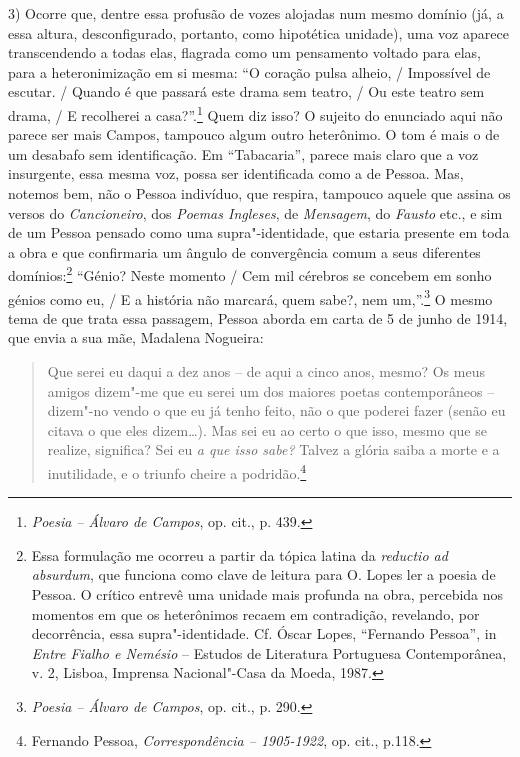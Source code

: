 3) Ocorre que, dentre essa profusão de vozes alojadas num mesmo domínio
(já, a essa altura, desconfigurado, portanto, como hipotética unidade),
uma voz aparece transcendendo a todas elas, flagrada como um pensamento
voltado para elas, para a heteronimização em si mesma: ``O coração pulsa
alheio, / Impossível de escutar. / Quando é que passará este drama sem
teatro, / Ou este teatro sem drama, / E recolherei a casa?''.\footnote{\emph{Poesia
  -- Álvaro de Campos}, op. cit., p. 439.} Quem diz isso? O sujeito do
enunciado aqui não parece ser mais Campos, tampouco algum outro
heterônimo. O tom é mais o de um desabafo sem identificação. Em
``Tabacaria'', parece mais claro que a voz insurgente, essa mesma voz,
possa ser identificada como a de Pessoa. Mas, notemos bem, não o Pessoa
indivíduo, que respira, tampouco aquele que assina os versos do
\emph{Cancioneiro}, dos \emph{Poemas Ingleses}, de \emph{Mensagem}, do
\emph{Fausto} etc., e sim de um Pessoa pensado como uma
supra"-identidade, que estaria presente em toda a obra e que confirmaria
um ângulo de convergência comum a seus diferentes domínios:\footnote{Essa
  formulação me ocorreu a partir da tópica latina da \emph{reductio ad
  absurdum}, que funciona como clave de leitura para O. Lopes ler a
  poesia de Pessoa. O crítico entrevê uma unidade mais profunda na obra,
  percebida nos momentos em que os heterônimos recaem em contradição,
  revelando, por decorrência, essa supra"-identidade. Cf. Óscar Lopes,
  ``Fernando Pessoa'', in \emph{Entre Fialho e Nemésio} -- Estudos de
  Literatura Portuguesa Contemporânea, v. 2, Lisboa, Imprensa
  Nacional"-Casa da Moeda, 1987.} ``Génio? Neste momento / Cem mil
cérebros se concebem em sonho génios como eu, / E a história não
marcará, quem sabe?, nem um,''.\footnote{\emph{Poesia -- Álvaro de
  Campos}, op. cit., p. 290.} O mesmo tema de que trata essa passagem,
Pessoa aborda em carta de 5 de junho de 1914, que envia a sua mãe,
Madalena Nogueira:

\begin{quote}
Que serei eu daqui a dez anos -- de aqui a cinco anos, mesmo? Os meus
amigos dizem"-me que eu serei um dos maiores poetas contemporâneos --
dizem"-no vendo o que eu já tenho feito, não o que poderei fazer (senão
eu citava o que eles dizem\ldots{}). Mas sei eu ao certo o que isso, mesmo
que se realize, significa? Sei eu \emph{a que isso sabe?} Talvez a
glória saiba a morte e a inutilidade, e o triunfo cheire a
podridão.\footnote{Fernando Pessoa, \emph{Correspondência -- 1905-1922},
  op. cit., p.118.}
\end{quote}

